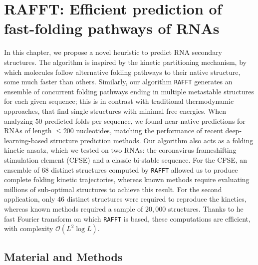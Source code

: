 \chapter{RAFFT: Efficient prediction of fast-folding pathways of RNAs}\label{ch:rafft}

In this chapter, we propose a novel heuristic to predict RNA secondary structures. The algorithm is inspired by the kinetic partitioning mechanism, by which molecules follow alternative folding pathways to their native structure, some much faster than others. Similarly, our algorithm \texttt{RAFFT} generates an ensemble of concurrent folding pathways ending in multiple metastable structures for each given sequence; this is in contrast with traditional thermodynamic approaches, that find single structures with minimal free energies. When analyzing $50$ predicted folds per sequence, we found near-native predictions for RNAs of length $\leq 200$ nucleotides, matching the performance of recent deep-learning-based structure prediction methods. Our algorithm also acts as a folding kinetic ansatz, which we tested on two RNAs: the coronavirus frameshifting stimulation element (CFSE) and a classic bi-stable sequence. For the CFSE, an ensemble of $68$ distinct structures computed by \texttt{RAFFT} allowed us to produce complete folding kinetic trajectories, whereas known methods require evaluating millions of sub-optimal structures to achieve this result. For the second application, only $46$ distinct structures were required to reproduce the kinetics, whereas known methods required a sample of $20,000$ structures. Thanks to he fast Fourier transform on which \texttt{RAFFT} is based, these computations are efficient, with complexity $\mathcal{O}(L^2 \log L)$. 

\section{Material and Methods}
